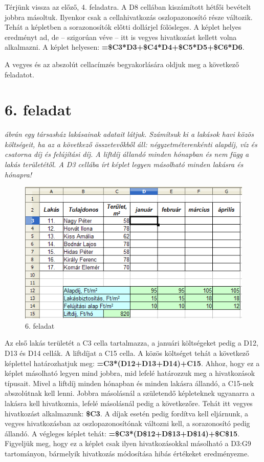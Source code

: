 Térjünk vissza az előző, 4. feladatra. A D8 cellában
kiszámított hétfői bevételt jobbra másoltuk. Ilyenkor
csak a cellahivatkozás oszlopazonosító része változik.
Tehát a képletben a sorazonosítók előtti dollárjel
fölösleges. A képlet helyes eredményt ad, de --  szigorúan
véve --  itt is vegyes hivatkozást kellett volna alkalmazni. A
képlet helyesen:
\textsf{\textbf{=\$C3*D3+\$C4*D4+\$C5*D5+\$C6*D6}}.

A vegyes és az abszolút cellacímzés begyakorlására oldjuk
meg a következő feladatot.

\section{6. feladat}
{\itshape
{} ábrán egy társasház lakásainak adatait látjuk.
Számítsuk ki a lakások havi közös költségeit, ha az a
következő összetevőkből áll:
négyzetméterenkénti alapdíj, víz és csatorna díj és
felújítási díj. A liftdíj állandó minden hónapban és
nem függ a lakás területétől. A D3 cellába írt képlet
legyen másolható minden lakásra és hónapra!}

\begin{figure}[!h]
\begin{center}
\includegraphics[width=12.813cm]{oocalcv1-img30.png}
\caption{6. feladat}\label{6-feladat}
\end{center}
\end{figure}

Az első lakás területét a C3 cella tartalmazza, a januári
költségeket pedig a D12, D13 és D14 cellák. A liftdíjat a C15
cella. A közös költséget tehát a következő képlettel
határozhatjuk meg:
\textsf{\textbf{=C3*(D12+D13+D14)+C15}}. Ahhoz, hogy
ez a képlet másolható legyen mind jobbra, mid lefelé
határozzuk meg a hivatkozások típusait. Mivel a liftdíj minden
hónapban és minden lakásra állandó,  a C15-nek abszolútnak
kell lenni. Jobbra másolásnál a születendő képleteknek
ugyanarra a lakásra  kell hivatkoznia, lefelé másolásnál
pedig a következőre. Tehát itt vegyes hivatkozást
alkalmazunk: \textsf{\textbf{\$C3}}. A díjak
esetén pedig fordítva kell eljárnunk, a vegyes hivatkozásban az
oszlopazonosítónak változni kell, a sorazonosító pedig
állandó. A végleges képlet tehát:
\textsf{\textbf{=\$C3*(D\$12+D\$13+D\$14)+\$C\$15}}. 
Figyeljük meg, hogy ez a képlet csak ilyen
hivatkozásokkal másolható a D3:G9 tartományon, bármelyik
hivatkozás módosítása hibás értékeket eredményezne.

